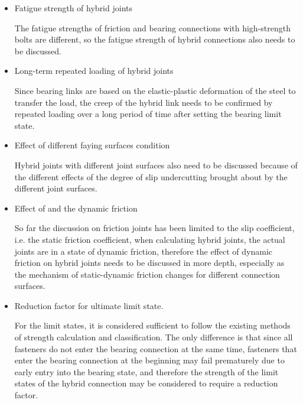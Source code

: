 \begin{itemize}


\item Fatigue strength of hybrid joints

The fatigue strengths of friction and bearing connections with high-strength bolts are different, so the fatigue strength of hybrid connections also needs to be discussed.

\item Long-term repeated loading of hybrid joints

Since bearing links are based on the elastic-plastic deformation of the steel to transfer the load, the creep of the hybrid link needs to be confirmed by repeated loading over a long period of time after setting the bearing limit state.

\item Effect of different faying surfaces condition

Hybrid joints with different joint surfaces also need to be discussed because of the different effects of the degree of slip undercutting brought about by the different joint surfaces.

\item Effect of and the dynamic friction

So far the discussion on friction joints has been limited to the slip coefficient, i.e. the static friction coefficient, when calculating hybrid joints, the actual joints are in a state of dynamic friction, therefore the effect of dynamic friction on hybrid joints needs to be discussed in more depth, especially as the mechanism of static-dynamic friction changes for different connection surfaces.

\item Reduction factor for ultimate limit state.

For the limit states, it is considered sufficient to follow the existing methods of strength calculation and classification. The only difference is that since all fasteners do not enter the bearing connection at the same time, fasteners that enter the bearing connection at the beginning may fail prematurely due to early entry into the bearing state, and therefore the strength of the limit states of the hybrid connection may be considered to require a reduction factor.

\end{itemize}

